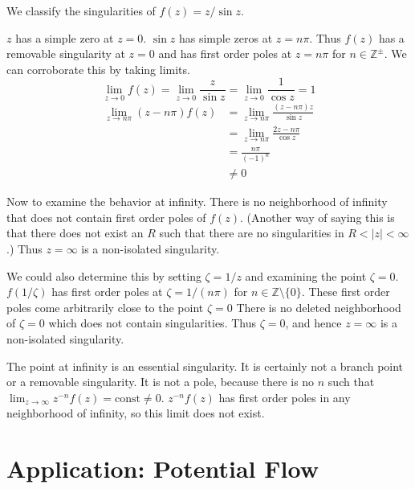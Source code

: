 \begin{Example}
  \label{example_z_sin_z}
  We classify the singularities of $f(z) = z / \sin z$.

  $z$ has a simple zero at $z = 0$.  $\sin z$ has simple zeros at $z =
  n \pi$.  Thus $f(z)$ has a removable singularity at $z = 0$ and has
  first order poles at $z =n \pi$ for $n \in \mathbb{Z}^\pm$.  We can
  corroborate this by taking limits.
  \[
  \lim_{z \to 0} f(z)
  = \lim_{z \to 0} \frac{z}{\sin z}
  = \lim_{z \to 0} \frac{1}{\cos z}
  = 1
  \]
  \begin{align*}
    \lim_{z \to n \pi} (z - n \pi) f(z)
    &= \lim_{z \to n \pi} \frac{ (z - n \pi) z }{ \sin z } 
    \\
    &= \lim_{z \to n \pi} \frac{ 2 z - n \pi }{ \cos z } 
    \\
    &= \frac{ n \pi }{ (-1)^n } 
    \\
    &\neq 0
  \end{align*}


  Now to examine the behavior at infinity.  
  There is no neighborhood of infinity that does not contain first order
  poles of $f(z)$.  (Another way of saying this is that there does not 
  exist an $R$ such that there are no singularities in $R < |z| < \infty$.)
  Thus $z = \infty$ is a non-isolated singularity.

  We could also determine this by
  setting $\zeta = 1/z$ and examining the point $\zeta = 0$.
  $f(1/\zeta)$ has first order poles at $\zeta = 1/(n \pi)$
  for $n \in \mathbb{Z} \setminus \{ 0 \}$.
  These first order poles come arbitrarily close to the point $\zeta = 0$
  There is no deleted neighborhood of $\zeta = 0$ which does not contain
  singularities.  Thus $\zeta = 0$, and hence $z = \infty$ is a non-isolated
  singularity.

  The point at infinity is an essential singularity.  It is certainly not
  a branch point or a removable singularity.  It is not a pole, because 
  there is no $n$ such that 
  $\lim_{z \to \infty} z^{-n} f(z) = \mathrm{const} \neq 0$.
  $z^{-n} f(z)$ has first order poles in any neighborhood of infinity, 
  so this limit does not exist.  
\end{Example}








\section{Application: Potential Flow}












